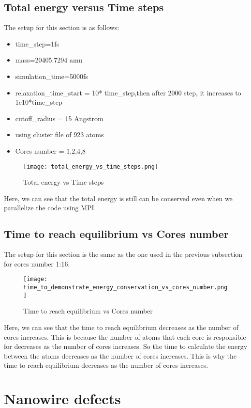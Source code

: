     \subsection{Total energy versus Time steps}
    The setup for this section is as follows:
    \begin{itemize}
        \item time\_step=1fs
        \item mass=20405.7294 amu
        \item simulation\_time=5000fs
        \item relaxation\_time\_start = 10* time\_step,then after 2000 step, it increases to 1e10*time\_step
        \item cutoff\_radius = 15 Angstrom
        \item using cluster file of 923 atoms
        \item Cores number = 1,2,4,8
    \end{itemize}
    \graphicspath{ {./figures/milestone08/} }
        \begin{figure}[!htb]
        \centering
            \texttt{[image: total\_energy\_vs\_time\_steps.png]}
            \caption{Total energy vs Time steps}
        \end{figure}
        Here, we can see that the total energy is still can be conserved even when we parallelize the code using MPI.

    \subsection{Time to reach equilibrium vs Cores number}
    The setup for this section is the same as the one used in the previous subsection for cores number 1:16.
        \graphicspath{ {./figures/milestone08/} }
        \begin{figure}[!htb]
        \centering
            \texttt{[image: time\_to\_demonstrate\_energy\_conservation\_vs\_cores\_number.png]}
            \caption{Time to reach equilibrium vs Cores number}
        \end{figure}
        Here, we can see that the time to reach equilibrium decreases as the number of cores increases. This is because the number of atoms that each core is responsible for decreases as the number of cores increases. So the time to calculate the energy between the atoms decreases as the number of cores increases. This is why the time to reach equilibrium decreases as the number of cores increases.

\section{Nanowire defects}